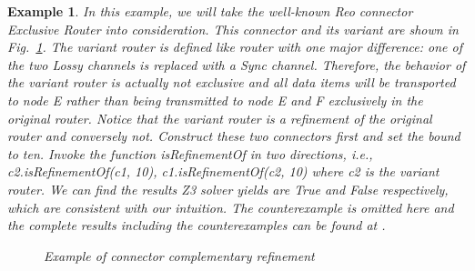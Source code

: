 \documentclass[preprint,3p]{elsarticle}
\newtheorem{example}{Example}[section]
\begin{document}
\begin{example}
In this example, we will take the well-known Reo connector \emph{Exclusive Router} into consideration. This connector and its variant are shown in Fig.~\ref{fig:router}. The \emph{variant router} is defined like \emph{router} with one major difference: one of the two \emph{Lossy} channels is replaced with a \emph{Sync} channel. Therefore, the behavior of the variant router is actually not exclusive and all data items will be transported to node \emph{E} rather than being transmitted to node \emph{E} and \emph{F} exclusively in the original router. Notice that the variant router is a refinement of the original router and conversely not. Construct these two connectors first and set the bound to ten. Invoke the function \emph{isRefinementOf} in two directions, i.e., \emph{c2.isRefinementOf(c1, 10), c1.isRefinementOf(c2, 10)} where \emph{c2} is the variant router. We can find the results Z3 solver yields are \emph{True} and \emph{False} respectively, which are consistent with our intuition.
The counterexample is omitted here and the complete results including the counterexamples can be found at \cite{reo2coq2Z3}. 
\begin{figure}
\centering
{}
\caption{Example of connector complementary refinement }\label{fig:router}
\end{figure}


\end{example}
\end{document}
